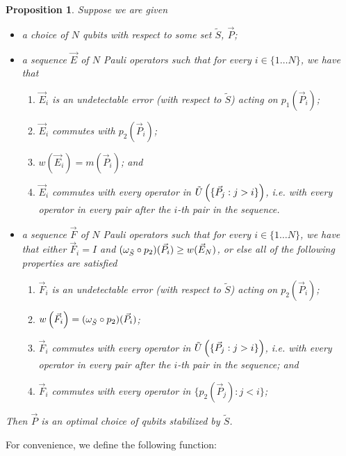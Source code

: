 \documentclass[twocolumn,showpacs,preprintnumbers,amsmath,amssymb,nofootinbib,pra,floatfix]{revtex4-1}
\newtheorem{proposition}{Proposition}
\newcommand{\lst}{\vec}
\newcommand{\set}{\tilde}
\begin{document}
\begin{proposition}
\label{proposition-optimality-condition}
Suppose we are given
\begin{itemize}
\item a choice of $N$ qubits with respect to some set $\set S$, $\lst P$;
\item a sequence $\lst E$ of $N$ Pauli operators such that for every $i\in\{1\dots N\}$, we have that
\begin{enumerate}
\item $\lst E_i$ is an undetectable error (with respect to $\set S$) acting on $p_1(\lst P_i)$;
\item $\lst E_i$ commutes with $p_2(\lst P_i)$;
\item $w(\lst E_i)=m(\lst P_i)$; and
\item $\lst E_i$ commutes with every operator in $\set U\paren{\{\lst P_j:j>i\}}$, i.e. with every operator in every pair after the $i$-th pair in the sequence.
\end{enumerate}
\item a sequence $\lst F$ of $N$ Pauli operators such that for every $i\in\{1\dots N\}$, we have that either $\lst F_i=I$ and $(\om_{\set S} \circ p_2)(\lst P_i) \ge w(\lst E_N)$, or else all of the following properties are satisfied
\begin{enumerate}
\item $\lst F_i$ is an undetectable error (with respect to $\set S$) acting on $p_2(\lst P_i)$;
\item $w\paren{\lst F_i}=(\om_{\set S} \circ p_2)(\lst P_i)$;
\item $\lst F_i$ commutes with every operator in $\set U\paren{\{\lst P_j:j>i\}}$, i.e. with every operator in every pair after the $i$-th pair in the sequence; and
\item $\lst F_i$ commutes with every operator in $\{p_2(\lst P_j): j<i\}$;
\end{enumerate}
\end{itemize}
Then $\lst P$ is an \emph{optimal choice of qubits stabilized by} $\set S$.
\end{proposition}
For convenience, we define the following function:
\end{document}
